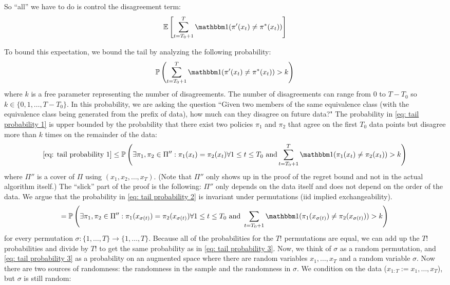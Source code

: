 \documentclass[11pt]{article}
\begin{document}
So ``all'' we have to do is control the disagreement term:
\begin{equation}
\E{\sum_{t=T_0+1}^T\ind(\pi'(x_t)\neq \pi^*(x_t))} \label{eq: disagreement term}
\end{equation}

To bound this expectation, we bound the tail by analyzing the following probability:
\begin{equation}\label{eq: tail probability 1}
\prob{\sum_{t=T_0+1}^T\ind(\pi'(x_t)\neq \pi^*(x_t))>k}
\end{equation}
where $k$ is a free parameter representing the number of disagreements.  The number of disagreements can range from $0$ to $T-T_0$ so $k \in \{0,1,\ldots,T-T_0\}$. In this probability, we are asking the question ``Given two members of the same equivalence class (with the equivalence class being generated from the prefix of data), how much can they disagree on future data?" The probability in \eqref{eq: tail probability 1} is upper bounded by the probability that there exist two policies $\pi_1$ and $\pi_2$ that agree on the first $T_0$ data points but disagree more than $k$ times on the remainder of the data:
\begin{equation}\label{eq: tail probability 2}
\eqref{eq: tail probability 1}\le \prob{\exists \pi_1,\pi_2 \in \Pi'': \pi_1(x_t) = \pi_2(x_t) \forall 1 \le t \le T_0 \text{ and}  \sum_{t=T_0+1}^T\ind(\pi_1(x_t)\neq \pi_2(x_t)) > k}
\end{equation}
where $\Pi''$ is a cover of $\Pi$ using $(x_1,x_2,\ldots,x_T)$. (Note that $\Pi''$ only shows up in the proof of the regret bound and not in the actual algorithm itself.) The ``slick'' part of the proof is the following: $\Pi''$ only depends on the data itself and does not depend on the order of the data. We argue that the probability in \eqref{eq: tail probability 2} is invariant under permutations (iid implied exchangeability). 
\begin{equation}\label{eq: tail probability 3}
=\prob{\exists \pi_1,\pi_2 \in \Pi'': \pi_1(x_{\sigma(t)})= \pi_2(x_{\sigma(t)}) \forall 1 \le t \le T_0 \text{ and } \sum_{t=T_0+1} \ind(\pi_1(x_{\sigma(t)})\neq \pi_2(x_{\sigma(t)})) > k}
\end{equation} 
for every permutation $\sigma: \{1,\ldots,T\} \rightarrow \{1,\ldots,T\}$. Because all of the probabilities for the $T!$ permutations are equal, we can add up the $T!$ probabilities and divide by $T!$ to get the same probability as in \eqref{eq: tail probability 3}. Now, we think of $\sigma$ as a random permutation, and \eqref{eq: tail probability 3} as a probability on an augmented space where there are random variables $x_1,\ldots, x_T$ and a random variable $\sigma$. Now there are two sources of randomness: the randomness in the sample and the randomness in $\sigma$. We condition on the data ($x_{1:T}:=x_1,\ldots, x_T$), but $\sigma$ is still random:
\end{document}
